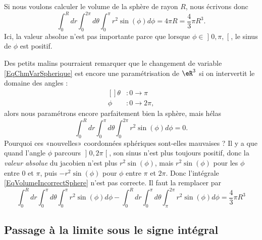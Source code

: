 Si nous voulons calculer le volume de la sphère de rayon $R$, nous écrivons donc
\begin{equation}
	\int_0^Rdr\int_{0}^{2\pi}d\theta\int_0^{\pi}r^2 \sin(\phi)d\phi=4\pi R=\frac{ 4 }{ 3 }\pi R^3.
\end{equation}
Ici, la valeur absolue n'est pas importante parce que lorsque $\phi\in\mathopen] 0,\pi ,  \mathclose[$, le sinus de $\phi$ est positif.

Des petits malins pourraient remarquer que le changement de variable \eqref{EqChmVarSpherique} est encore une paramétrisation de $\eR^3$ si on intervertit le domaine des angles : 
\begin{equation}
	\begin{aligned}[]
		\theta&\colon 0 \to \pi\\
		\phi	&\colon 0\to 2\pi,
	\end{aligned}
\end{equation}
alors nous paramétrons encore parfaitement bien la sphère, mais hélas
\begin{equation}		\label{EqVolumeIncorrectSphere}
	\int_0^Rdr\int_{0}^{\pi}d\theta\int_0^{2\pi}r^2 \sin(\phi)d\phi=0.
\end{equation}
Pourquoi ces «nouvelles» coordonnées sphériques sont-elles mauvaises ? Il y a que quand l'angle $\phi$ parcours $\mathopen] 0 , 2\pi \mathclose[$, son sinus n'est plus toujours positif, donc la \emph{valeur absolue} du jacobien n'est plus $r^2\sin(\phi)$, mais $r^2\sin(\phi)$ pour les $\phi$ entre $0$ et $\pi$, puis $-r^2\sin(\phi)$ pour $\phi$ entre $\pi$ et $2\pi$. Donc l'intégrale \eqref{EqVolumeIncorrectSphere} n'est pas correcte. Il faut la remplacer par
\begin{equation}
	\int_0^Rdr\int_{0}^{\pi}d\theta\int_0^{\pi}r^2 \sin(\phi)d\phi- \int_0^Rdr\int_{0}^{\pi}d\theta\int_{\pi}^{2\pi}r^2 \sin(\phi)d\phi = \frac{ 4 }{ 3 }\pi R^3
\end{equation}

					\subsection{Passage à la limite sous le signe intégral}

